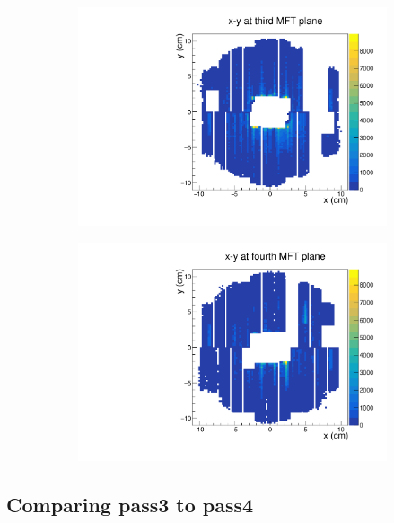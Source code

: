 \begin{figure}[h]
\begin{subfigure}[t]{.45\linewidth}
        \includegraphics[width=\linewidth]{Plots/pass3_MFT/x_y_3_pass3.pdf}
        \caption{}
        \label{}
    \end{subfigure}
    \hfill
    \begin{subfigure}[t]{.45\linewidth}
        \centering
        \includegraphics[width=\linewidth]{Plots/pass3_MFT/x_y_4_pass3.pdf}
        \caption{}
        \label{}
    \end{subfigure}
\caption{}
\label{fig:MFT_x_y_pass3}
\end{figure}

\subsection{Comparing pass3 to pass4}\label{sec:comapring}

